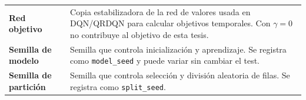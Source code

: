 \begin{longtable}{@{}p{3.8cm}p{9.6cm}@{}}
\textbf{Red objetivo} & Copia estabilizadora de la red de valores usada en DQN/QRDQN para calcular objetivos temporales. Con $\gamma = 0$ no contribuye al objetivo de esta tesis. \\
\textbf{Semilla de modelo} & Semilla que controla inicialización y aprendizaje. Se registra como \texttt{model\_seed} y puede variar sin cambiar el test. \\[2pt]
\textbf{Semilla de partición} & Semilla que controla selección y división aleatoria de filas. Se registra como \texttt{split\_seed}. \\
\end{longtable}
